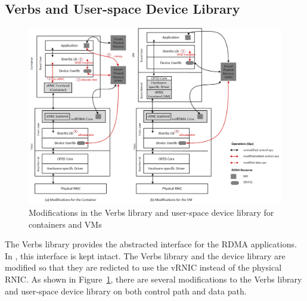 \subsection{Verbs and User-space Device Library}


\begin{figure}[!ht]
	\centering
	\includegraphics[width=0.72\linewidth]{images/verbs-driver}
	\caption{Modifications in the Verbs library and user-space device library for containers and VMs}
	\label{fig:verbs-driver}
\end{figure}


The Verbs library provides the abstracted interface for the RDMA applications. In \sys, this interface is kept intact.
The Verbs library and the device library are modified so that they are redicted to use the vRNIC instead of the physical RNIC. As shown in Figure~\ref{fig:verbs-driver}, there are several modifications to the Verbs library and user-space device library on both control path and data path.



